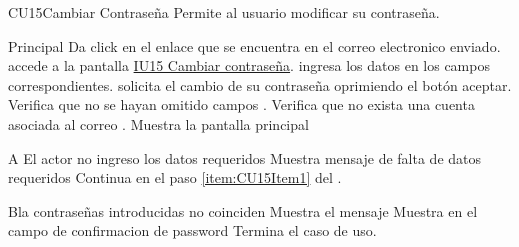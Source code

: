 
% 



	\begin{UseCase}{CU15}{Cambiar Contraseña}{
		Permite al usuario modificar su contraseña.
	}
	\end{UseCase}
	\begin{UCtrayectoria}{Principal}
		\UCpaso[\UCactor] Da click en el enlace que se encuentra en el correo electronico enviado.
        \UCpaso [\UCsist] accede a la pantalla \hyperref[fig:IU15]{IU15 Cambiar contraseña}. \label{item:CU15Item1}
		\UCpaso[\UCactor] ingresa los datos en los campos correspondientes. 
      \UCpaso[\UCactor]   solicita el cambio de su contraseña oprimiendo el botón aceptar.
		\UCpaso Verifica que no se hayan omitido campos  .
       \UCpaso  Verifica que no exista una cuenta asociada al correo 	.
       \UCpaso Muestra la pantalla principal
	\end{UCtrayectoria}

		\begin{UCtrayectoriaA}{A}{ El actor no ingreso los datos requeridos}
			\UCpaso Muestra mensaje de falta de datos requeridos
			\UCpaso Continua en el paso \ref{item:CU15Item1} del .
		\end{UCtrayectoriaA}
        
		\begin{UCtrayectoriaA}{B}{la contraseñas introducidas no coinciden}
			\UCpaso Muestra el mensaje 
			\UCpaso Muestra en el campo de confirmacion de password
            \UCpaso[] Termina el caso de uso.
		\end{UCtrayectoriaA}
		


		
		
		
